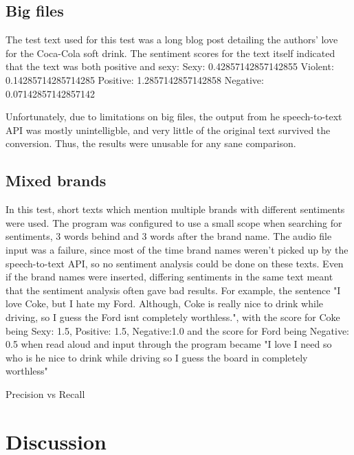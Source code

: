 \documentclass[a4paper,12pt,twoside]{ltxdoc}
\begin{document}
\subsection{Big files}
The test text used for this test was a long blog post detailing the authors' love for the Coca-Cola soft drink. The sentiment scores for the text itself indicated that the text was both positive and sexy:
Sexy: 0.42857142857142855 Violent: 0.14285714285714285 Positive: 1.2857142857142858 Negative: 0.07142857142857142

Unfortunately, due to limitations on big files, the output from he speech-to-text API was mostly unintelligble, and very little of the original text survived the conversion. Thus, the results were unusable for any sane comparison.

\subsection{Mixed brands}
In this test, short texts which mention multiple brands with different sentiments were used. The program was configured to use a small scope when searching for sentiments, 3 words behind and 3 words after the brand name. The audio file input was a failure, since most of the time brand names weren't picked up by the speech-to-text API, so no sentiment analysis could be done on these texts. Even if the brand names were inserted, differing sentiments in the same text meant that the sentiment analysis often gave bad results. For example, the sentence "I love Coke, but I hate my Ford. Although, Coke is really nice to drink while driving, so I guess the Ford isnt completely worthless.", with the score for Coke being 
Sexy: 1.5, Positive: 1.5, Negative:1.0
and the score for Ford being
Negative: 0.5
when read aloud and input through the program became "I love I need so who is he nice to drink while driving so I guess the board in completely worthless"

Precision vs Recall

\section{Discussion}


\newpage 
\end{document}
